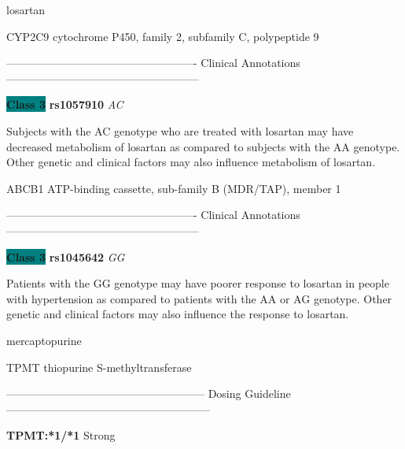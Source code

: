 \documentclass{resume} %
\begin{document}
\begin{rSection}{ losartan }
\begin{rSubsection}{ CYP2C9 }{ cytochrome P450, family 2, subfamily C, polypeptide 9 }{}{}
\item[] ---------------------------------------------------- Clinical Annotations -----------------------------------------------------\newline
\item \textbf{\colorbox{teal} {Class 3}} \textbf{ rs1057910 } \textit{ AC }
\item[] Subjects with the AC genotype who are treated with losartan may have decreased metabolism of losartan as compared to subjects with the AA genotype. Other genetic and clinical factors may also influence metabolism of losartan.
\end{rSubsection}\begin{rSubsection}{ ABCB1 }{ ATP-binding cassette, sub-family B (MDR/TAP), member 1 }{}{}
\item[]

\item[] ---------------------------------------------------- Clinical Annotations -----------------------------------------------------\newline
\item \textbf{\colorbox{teal} {Class 3}} \textbf{ rs1045642 } \textit{ GG }
\item[] Patients with the GG genotype may have poorer response to losartan in people with hypertension as compared to patients with the AA or AG genotype. Other genetic and clinical factors may also influence the response to losartan.
\end{rSubsection}

\end{rSection}\begin{rSection}{ mercaptopurine }
\item[]

\begin{rSubsection}{ TPMT }{ thiopurine S-methyltransferase }{}{}
\item[]
\item[] ------------------------------------------------------ Dosing Guideline --------------------------------------------------------\newline
\item[]
\item[] \textbf{ TPMT:*1/*1 } Strong


\end{rSubsection}
\end{rSection}
\end{document}
